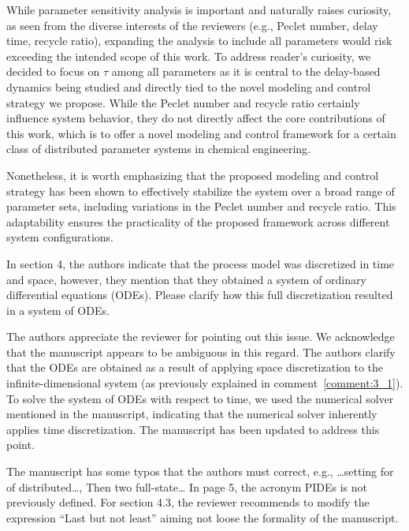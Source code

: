 \documentclass[11pt,answers]{exam}
\begin{document}
\begin{questions}
\begin{solutionorbox}
        While parameter sensitivity analysis is important and naturally raises curiosity, as seen from the diverse interests of the reviewers (e.g., Peclet number, delay time, recycle ratio), expanding the analysis to include all parameters would risk exceeding the intended scope of this work. To address reader's curiosity, we decided to focus on \( \tau \) among all parameters as it is central to the delay-based dynamics being studied and directly tied to the novel modeling and control strategy we propose. While the Peclet number and recycle ratio certainly influence system behavior, they do not directly affect the core contributions of this work, which is to offer a novel modeling and control framework for a certain class of distributed parameter systems in chemical engineering.
    
        Nonetheless, it is worth emphasizing that the proposed modeling and control strategy has been shown to effectively stabilize the system over a broad range of parameter sets, including variations in the Peclet number and recycle ratio. This adaptability ensures the practicality of the proposed framework across different system configurations.
    \end{solutionorbox}


    \question In section 4, the authors indicate that the process model was discretized in time and space, however, they mention that they obtained a system of ordinary differential equations (ODEs). Please clarify how this full discretization resulted in a system of ODEs.

    \begin{solutionorbox} \label{comment:3_4}
        The authors appreciate the reviewer for pointing out this issue. We acknowledge that the manuscript appears to be ambiguous in this regard. The authors clarify that the ODEs are obtained as a result of applying space discretization to the infinite-dimensional system (as previously explained in comment~\ref{comment:3_1}). To solve the system of ODEs with respect to time, we used the numerical solver mentioned in the manuscript, indicating that the numerical solver inherently applies time discretization. The manuscript has been updated to address this point.
    \end{solutionorbox}

    \question The manuscript has some typos that the authors must correct, e.g., …setting for of distributed…, Then two full-state… In page 5, the acronym PIDEs is not previously defined. For section 4.3, the reviewer recommends to modify the expression “Last but not least” aiming not loose the formality of the manuscript.


\end{questions}
\end{document}
